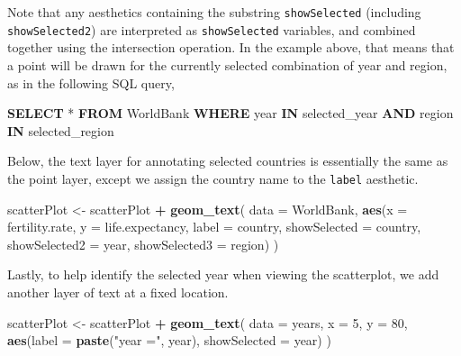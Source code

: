 \documentclass[12pt,]{article}
\newenvironment{Shaded}{\begin{snugshade}}{\end{snugshade}}
\newcommand{\DataTypeTok}[1]{\textcolor[rgb]{0.13,0.29,0.53}{#1}}
\newcommand{\DecValTok}[1]{\textcolor[rgb]{0.00,0.00,0.81}{#1}}
\newcommand{\KeywordTok}[1]{\textcolor[rgb]{0.13,0.29,0.53}{\textbf{#1}}}
\newcommand{\NormalTok}[1]{#1}
\newcommand{\OperatorTok}[1]{\textcolor[rgb]{0.81,0.36,0.00}{\textbf{#1}}}
\newcommand{\StringTok}[1]{\textcolor[rgb]{0.31,0.60,0.02}{#1}}
\theoremstyle{definition}
\theoremstyle{definition}
\theoremstyle{definition}
\theoremstyle{remark}
\begin{document}
Note that any aesthetics containing the substring \texttt{showSelected}
(including \texttt{showSelected2}) are interpreted as
\texttt{showSelected} variables, and combined together using the
intersection operation. In the example above, that means that a point
will be drawn for the currently selected combination of year and region,
as in the following SQL query,

\begin{Shaded}
\begin{Highlighting}[]
\KeywordTok{SELECT}\NormalTok{ * }\KeywordTok{FROM}\NormalTok{ WorldBank}
  \KeywordTok{WHERE} \DataTypeTok{year}   \KeywordTok{IN}\NormalTok{ selected_year}
  \KeywordTok{AND}\NormalTok{   region }\KeywordTok{IN}\NormalTok{ selected_region}
\end{Highlighting}
\end{Shaded}

Below, the text layer for annotating selected countries is essentially
the same as the point layer, except we assign the country name to the
\texttt{label} aesthetic.

\begin{Shaded}
\begin{Highlighting}[]
\NormalTok{scatterPlot <-}\StringTok{ }\NormalTok{scatterPlot }\OperatorTok{+}\StringTok{ }\KeywordTok{geom_text}\NormalTok{(}
  \DataTypeTok{data =}\NormalTok{ WorldBank,}
  \KeywordTok{aes}\NormalTok{(}\DataTypeTok{x =}\NormalTok{ fertility.rate, }\DataTypeTok{y =}\NormalTok{ life.expectancy,}
      \DataTypeTok{label =}\NormalTok{ country,}
      \DataTypeTok{showSelected =}\NormalTok{ country,}
      \DataTypeTok{showSelected2 =}\NormalTok{ year,}
      \DataTypeTok{showSelected3 =}\NormalTok{ region)}
\NormalTok{)}
\end{Highlighting}
\end{Shaded}

Lastly, to help identify the selected year when viewing the scatterplot,
we add another layer of text at a fixed location.

\begin{Shaded}
\begin{Highlighting}[]
\NormalTok{scatterPlot <-}\StringTok{ }\NormalTok{scatterPlot }\OperatorTok{+}\StringTok{ }\KeywordTok{geom_text}\NormalTok{(}
  \DataTypeTok{data =}\NormalTok{ years, }\DataTypeTok{x =} \DecValTok{5}\NormalTok{, }\DataTypeTok{y =} \DecValTok{80}\NormalTok{,}
  \KeywordTok{aes}\NormalTok{(}\DataTypeTok{label =} \KeywordTok{paste}\NormalTok{(}\StringTok{"year ="}\NormalTok{, year),}
      \DataTypeTok{showSelected =}\NormalTok{ year)}
\NormalTok{)}
\end{Highlighting}
\end{Shaded}
\end{document}
